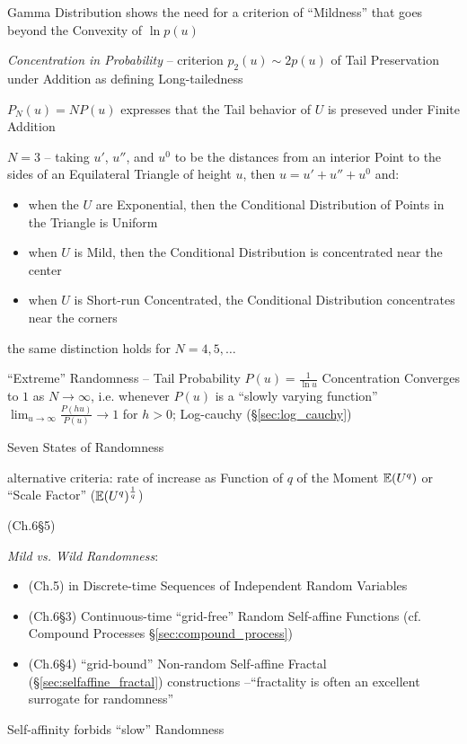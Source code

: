 \fist Gamma Distribution shows the need for a criterion of ``Mildness'' that
goes beyond the Convexity of $\ln p(u)$

\emph{Concentration in Probability} -- criterion $p_2(u) \sim 2p(u)$ of Tail
Preservation under Addition as defining Long-tailedness

$P_N(u) = NP(u)$ expresses that the Tail behavior of $U$ is preseved under
Finite Addition

$N = 3$ -- taking $u'$, $u''$, and $u^0$ to be the distances from an interior
Point to the sides of an Equilateral Triangle of height $u$, then $u = u' + u''
+ u^0$ and:
\begin{itemize}
  \item when the $U$ are Exponential, then the Conditional Distribution of
    Points in the Triangle is Uniform
  \item when $U$ is Mild, then the Conditional Distribution is concentrated near
    the center
  \item when $U$ is Short-run Concentrated, the Conditional Distribution
    concentrates near the corners
\end{itemize}
the same distinction holds for $N = 4, 5, \ldots$

``Extreme'' Randomness -- Tail Probability $P(u) = \frac{1}{\ln u}$
Concentration Converges to $1$ as $N \to \infty$, i.e. whenever $P(u)$ is a
``slowly varying function'' $\lim_{u\to\infty}\frac{P(hu)}{P(u)} \to 1$ for
$h > 0$; Log-cauchy (\S\ref{sec:log_cauchy})

Seven States of Randomness

alternative criteria: rate of increase as Function of $q$ of the Moment
$\mathbb{E}(U^q)$ or ``Scale Factor'' ($\mathbb{E}(U^q)^\frac{1}{q}$)

(Ch.6\S5)

\emph{Mild vs. Wild Randomness}:
\begin{itemize}
  \item (Ch.5) in Discrete-time Sequences of Independent Random Variables
  \item (Ch.6\S3) Continuous-time ``grid-free'' Random Self-affine Functions
    (cf. Compound Processes \S\ref{sec:compound_process})
  \item (Ch.6\S4) ``grid-bound'' Non-random Self-affine Fractal
    (\S\ref{sec:selfaffine_fractal}) constructions --``fractality is often an
    excellent surrogate for randomness''
\end{itemize}

Self-affinity forbids ``slow'' Randomness

